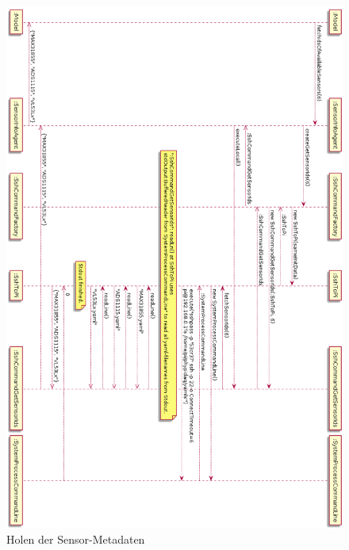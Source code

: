 \documentclass[parskip=full]{scrartcl}
\begin{document}
\begin{figure}[htbp]
	\begin{center}
		\includegraphics[width = 15cm]{Grafiken/2-FetchSensorInfos_Rotated.png}
		\caption{Holen der Sensor-Metadaten}
		\label{FetchSensorInfos}
	\end{center}
\end{figure}
\end{document}
